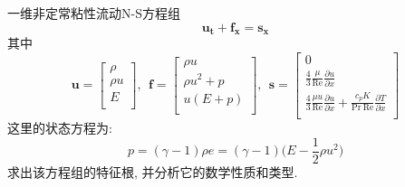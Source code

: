 \begin{problem}[问题2]
一维非定常粘性流动N-S方程组
\[
\mathbf{u_t} + \mathbf{f_x} = \mathbf{s_x}
\]
其中
\[
\mathbf{u} =
\left[
  \begin{array}{c}
    \rho \\
    \rho u\\
    E \\
  \end{array}
\right], ~~
\mathbf{f} =
\left[
  \begin{array}{c}
    \rho u \\
    \rho u^2 + p \\
    u(E+p) \\
  \end{array}
\right],~~
\mathbf{s} =
\left[
  \begin{array}{c}
    0 \\
    \frac{4}{3}\frac{\mu}{\textrm{Re}}\frac{\partial u}{\partial x} \\
    \frac{4}{3}\frac{\mu u}{\textrm{Re}}\frac{\partial u}{\partial x} + \frac{c_pK}{\textrm{Pr}~\textrm{Re}}\frac{\partial T}{\partial x} \\
  \end{array}
\right]
\]
这里的状态方程为:
\[
p = (\gamma -1)\rho e = (\gamma - 1)\Big(E-\frac{1}{2}\rho u^2\Big)
\]
求出该方程组的特征根, 并分析它的数学性质和类型.
\end{problem}

